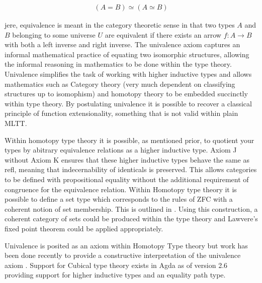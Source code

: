 \begin{align*}
    (A = B) \simeq (A \simeq B)
\end{align*}

jere, equivalence is meant in the category theoretic sense in that
two types $A$ and $B$ belonging to some universe $U$ are equivalent if there
exists an arrow $f : A \rightarrow B$ with both a left inverse and right
inverse. The univalence axiom captures an informal mathematical practice of
equating two isomorphic structures, allowing the informal reasoning in
mathematics to be done within the type theory. Univalence simplifies the task of
working with higher inductive types and allows mathematics such as Category
theory (very much dependent on classifying structures up to isomophism) and
homotopy theory to be embedded succinctly within type theory. By postulating
univalence it is possible to recover a classical principle of function
extensionality, something that is not valid within plain MLTT.

Within homotopy type theory it is possible, as mentioned prior, to quotient your
types by abitrary equivalence relations as a higher inductive type.
\textsf{Axiom J} without \textsf{Axiom K} ensures that these higher inductive
types behave the same as \textsf{refl}, meaning that indecernability of identicals
is preserved. This allows categories to be defined with propositional equality
without the additional requirement of congruence for the equivalence relation.
Within Homotopy type theory it is possible to define a set type which
corresponds to the rules of ZFC with a coherent notion of set membership. This
is outlined in . Using this construction, a coherent category of sets
could be produced within the type theory and Lawvere's fixed point theorem could
be applied appropriately.

Univalence is posited as an axiom within Homotopy Type theory but work has been
done recently to provide a constructive interpretation of the univalence axiom
.  Support for Cubical type theory exists in Agda as of version
2.6 providing support for higher inductive types and an equality path type.

